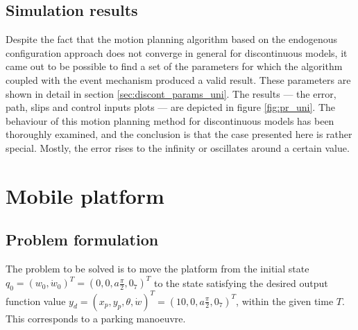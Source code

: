 \subsection{Simulation results}
Despite the fact that the motion planning algorithm based on the endogenous 
configuration approach does not converge in general for discontinuous models,
it came out to be possible to find a set of the parameters for which the algorithm
coupled with the event mechanism produced
a valid result. These parameters are shown in detail in section \ref{sec:discont_params_uni}.
The results --- the error, path, slips and control inputs plots --- are depicted
in figure \ref{fig:pr_uni}.
The behaviour of this motion planning method for discontinuous models has been thoroughly examined,
and the conclusion is that the case presented here is rather special. Mostly, the error rises to the infinity
or oscillates around a certain value.



\section{Mobile platform}
\subsection{Problem formulation}
\label{sec:rex_task}
The problem to be solved is to move the platform from the initial state
$q_0 = (w_0, \dot{w}_0)^T = (0, 0, a\frac{\pi}{2}, 0_7)^T$ to the state satisfying the desired
output function value
$y_d=(x_p, y_p, \theta, \dot w)^T = (10, 0, a\frac{\pi}{2}, 0_7)^T$, 
within the given time $T$. 
This corresponds to a parking manoeuvre.
%

